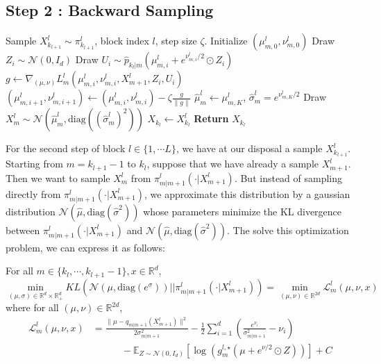 \documentclass[12pt]{article}
\begin{document}
\subsection{Step 2 : Backward Sampling}

\begin{algorithm}
\caption{DCPS Step 2: Backward Sampling on Block $l$}
\label{alg:dcps_step2}
\begin{algorithmic}[1]
    \Require Sample $X^l_{k_{l+1}} \sim \pi^l_{k_{l+1}}$, block index $l$, step size $\zeta$.
        \State Initialize $(\mu^l_{m,0}, \nu^l_{m,0})$
            \State Draw $Z_{i} \sim \mathcal{N}(0, I_d)$
            \State Draw $U_{i} \sim \hat{p}_{k_l|m}(\mu^l_{m,i} + e^{\nu^l_{m,i}/2} \odot Z_{i})$
            \State $g \gets \nabla_{(\mu, \nu)} L^l_m(\mu^l_{m,i}, \nu^l_{m,i}, X^l_{m+1}, Z_{i}, U_{i})$
            \State $(\mu^l_{m,i+1}, \nu^l_{m,i+1}) \gets 
            (\mu^l_{m,i}, \nu^l_{m,i}) - \zeta \frac{g}{\| g \|}$
        \EndFor
        \State $\hat{\mu}^l_m \gets \mu^l_{m,K}$, $\hat{\sigma}^l_m = e^{\nu^l_{m,K}/2}$
        \State Draw $X^l_m \sim \mathcal{N}(\hat{\mu}^l_m, \text{diag}((\hat{\sigma}^l_m)^2))$
    \EndFor
    \State $X_{k_l} \gets X^l_{k_l}$
    \State \textbf{Return} $X_{k_l}$
\end{algorithmic}
\end{algorithm}

For the second step of block $l \in \{1,\cdots L\}$, we have at our disposal a sample 
$X_{k_{l+1}}^l$. Starting from $m=k_{l+1}-1$ to $k_l$, suppose that we have already a sample $X_{m+1}^l$. 
Then we want to sample $X_{m}^l$ from $\pi^l_{m|m+1}(\cdot | X_{m+1}^l)$.
But instead of sampling directly from $\pi^l_{m|m+1}(\cdot | X_{m+1}^l)$, we approximate this distribution
by a gaussian distribution $\mathcal{N}(\hat{\mu}, \text{diag}(\hat{\sigma}^2))$ whose parameters 
minimize the KL divergence between $\pi^l_{m|m+1}(\cdot | X_{m+1}^l)$ and $\mathcal{N}(\hat{\mu}, \text{diag}(\hat{\sigma}^2))$.
The solve this optimization problem, we can express it as follows:

\begin{assumption}
    For all $m \in \{k_l, \cdots, k_{l+1}-1\}, x \in \mathbb{R}^d$,
    $$\min_{(\mu, \sigma)\in \mathbb{R}^d \times \mathbb{R}_+^d} KL \left( \mathcal{N}(\mu, \text{diag}(e^\sigma)) || \pi^l_{m|m+1}(\cdot | X_{m+1}^l)\right)
    = \min_{(\mu, \nu)\in \mathbb{R}^{2d}} \mathcal{L}^l_m(\mu, \nu, x)$$
    where for all $(\mu, \nu) \in \mathbb{R}^{2d}$,
    \begin{align*}
        \mathcal{L}^l_m(\mu, \nu, x)
        & = \frac{\| \mu - q_{m|m+1}(X^l_{m+1})\|^2}{2 \sigma_{m|m+1}^2} 
        - \frac{1}{2}\sum_{i=1}^d \left(\frac{e^{\nu_i}}{\sigma_{m|m+1}^2} - \nu_i \right) \\
        & \quad \quad \quad - \mathbb{E}_{Z \sim \mathcal{N}(0, I_d)}
        \left[ \log(g_m^{l,\star}(\mu + e^{\nu/2} \odot Z)) \right] + C
    \end{align*}
\end{assumption}
\end{document}
